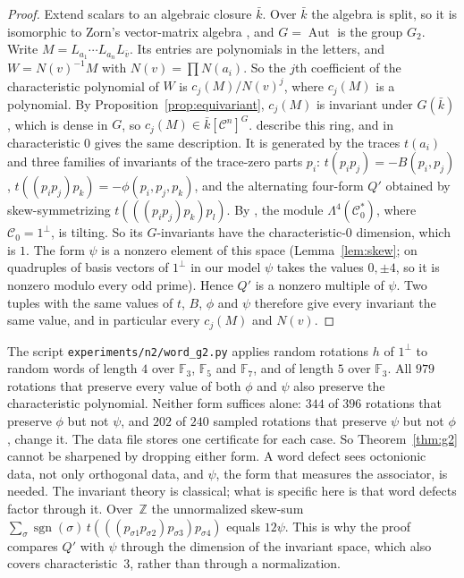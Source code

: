 \documentclass[11pt]{amsart}
\theoremstyle{definition}
\theoremstyle{remark}
\newcommand{\F}{\mathbb{F}}
\newcommand{\C}{\mathcal{C}}
\newcommand{\conj}[1]{\overline{#1}}
\begin{document}
\begin{proof}
Extend scalars to an algebraic closure $\bar k$. Over $\bar k$ the algebra is
split, so it is isomorphic to Zorn's vector-matrix algebra
\cite[Ch.~1]{springer2000}, and $G=\operatorname{Aut}$ is the group $G_2$.
Write $M=L_{a_1}\cdots L_{a_n}L_{\conj v}$. Its entries are polynomials in the
letters, and $W=N(v)^{-1}M$ with $N(v)=\prod N(a_i)$. So the $j$th coefficient
of the characteristic polynomial of $W$ is $c_j(M)/N(v)^j$, where $c_j(M)$ is a
polynomial. By Proposition~\ref{prop:equivariant}, $c_j(M)$ is invariant
under $G(\bar k)$, which is dense in $G$, so $c_j(M)\in\bar k[\C^n]^G$.
\cite[Cor.~7.11 and the remark after it]{zubkov-shestakov} describe this ring,
and in characteristic $0$ \cite{schwarz1988} gives the same description. It is
generated by the traces $t(a_i)$ and three families of invariants of the
trace-zero parts $p_i$: $t(p_ip_j)=-B(p_i,p_j)$, $t((p_ip_j)p_k)=-\phi(p_i,p_j,p_k)$,
and the alternating four-form $Q'$ obtained by skew-symmetrizing
$t(((p_ip_j)p_k)p_l)$.
By \cite[Prop.~3.2]{zubkov-shestakov}, the module $\Lambda^4(\C_0^*)$, where
$\C_0=1^\perp$, is tilting. So its $G$-invariants have the characteristic-$0$
dimension, which is $1$. The form $\psi$ is a nonzero element of this space
(Lemma~\ref{lem:skew}; on quadruples of basis vectors of $1^\perp$ in our
model $\psi$ takes the values $0,\pm4$, so it is nonzero modulo every odd
prime). Hence $Q'$ is a nonzero multiple of
$\psi$. Two tuples with the same values of $t$, $B$, $\phi$ and $\psi$
therefore give every invariant the same value, and in particular every
$c_j(M)$ and $N(v)$.
\end{proof}

The script \texttt{experiments/n2/word\_g2.py} applies random rotations $h$ of
$1^\perp$ to random words of length $4$ over $\F_3$, $\F_5$ and $\F_7$, and of
length $5$ over $\F_3$. All $979$ rotations that preserve every value of both
$\phi$ and $\psi$ also preserve the characteristic polynomial. Neither form
suffices alone: $344$ of $396$ rotations that preserve $\phi$ but not $\psi$,
and $202$ of $240$ sampled rotations that preserve $\psi$ but not $\phi$,
change it. The data file stores one certificate for each case. So
Theorem~\ref{thm:g2} cannot be sharpened by dropping either form. A word
defect sees octonionic data, not only orthogonal data, and $\psi$, the form
that measures the associator, is needed. The invariant theory is classical;
what is specific here is that word defects factor through it. Over~$\mathbb{Z}$
the unnormalized skew-sum
$\sum_\sigma\operatorname{sgn}(\sigma)\,t(((p_{\sigma1}p_{\sigma2})p_{\sigma3})p_{\sigma4})$
equals $12\psi$. This is why the proof compares $Q'$ with $\psi$ through the
dimension of the invariant space, which also covers characteristic~$3$,
rather than through a normalization.
\end{document}
